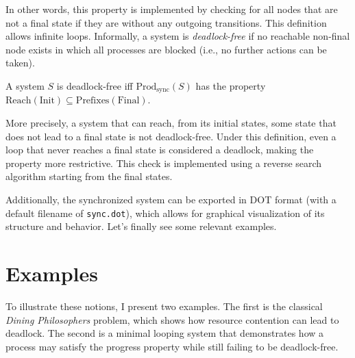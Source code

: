
In other words, this property is implemented by checking for all nodes 
that are not a final state
if they are without any outgoing transitions. 
This definition allows infinite loops.
Informally, a system is \emph{deadlock-free} if no reachable
non-final node exists in which all processes are blocked (i.e., no further
actions can be taken).

\begin{definition}
	A system $S$ is deadlock-free iff
    $\text{Prod}_{\text{sync}}(S)$ has the property
	$\text{Reach}(\text{Init})\subseteq \text{Prefixes}(\text{Final})$.
\end{definition}


More precisely, a system that can reach, from its initial states, some state
that does not lead to a final state is not deadlock-free. Under this definition,
even a loop that never reaches a final state is considered a deadlock,
making the property more restrictive. This check is implemented using a
reverse search algorithm starting from the final states.

Additionally, the synchronized system can be exported in DOT format
(with a default filename of \verb|sync.dot|), which allows for graphical 
visualization of its structure and behavior.
Let's finally see some relevant examples.


\section{Examples}

To illustrate these notions, I present two examples. The first is the
classical \emph{Dining Philosophers} problem, which shows how resource
contention can lead to deadlock. The second is a minimal looping system
that demonstrates how a process may satisfy the progress property while
still failing to be deadlock-free.

